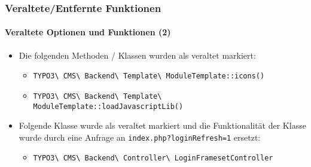 
\begin{frame}[fragile]
	\frametitle{Veraltete/Entfernte Funktionen}
	\framesubtitle{Veraltete Optionen und Funktionen (2)}

	\begin{itemize}
		\item Die folgenden Methoden / Klassen wurden als veraltet markiert:

			\begin{itemize}\smaller
				\item \texttt{TYPO3\textbackslash
					CMS\textbackslash
					Backend\textbackslash
					Template\textbackslash
					ModuleTemplate::icons()}

				\item \texttt{TYPO3\textbackslash
					CMS\textbackslash
					Backend\textbackslash
					Template\textbackslash
					ModuleTemplate::loadJavascriptLib()}

			\end{itemize}

		\item Folgende Klasse wurde als veraltet markiert und die Funktionalität der Klasse wurde durch eine
			Anfrage an \texttt{index.php?loginRefresh=1} ersetzt:
			
			\begin{itemize}\smaller
				\item \texttt{TYPO3\textbackslash
					CMS\textbackslash
					Backend\textbackslash
					Controller\textbackslash
					LoginFramesetController}
			\end{itemize}\smaller

	\end{itemize}

\end{frame}


